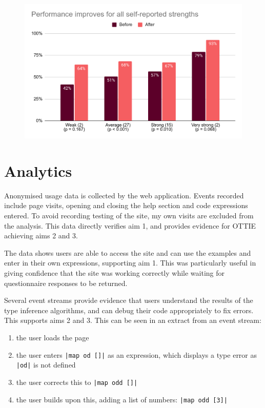 \documentclass[a4paper,fleqn,oneside,12pt]{report}
\begin{document}
{\centering \begin{figure}[h!]
  \centering
  \includegraphics[width=0.85\linewidth]{images/image27.png}
  \label{figure:evaluation_testperformanceselfreported}
\end{figure} \par}

\section{Analytics}\label{id:h.67g05flyfv0z}

Anonymised usage data is collected by the web application. Events recorded include page visits, opening and closing the help section and code expressions entered. To avoid recording testing of the site, my own visits are excluded from the analysis. This data directly verifies aim 1, and provides evidence for OTTIE achieving aims 2 and 3.

The data shows users are able to access the site and can use the examples and enter in their own expressions, supporting aim 1. This was particularly useful in giving confidence that the site was working correctly while waiting for questionnaire responses to be returned.

Several event streams provide evidence that users understand the results of the type inference algorithms, and can debug their code appropriately to fix errors. This supports aims 2 and 3. This can be seen in an extract from an event stream:
\begin{enumerate}
  \item the user loads the page
  \item the user enters \texttt{|map od []|} as an expression, which displays a type error as \texttt{|od|} is not defined
  \item the user corrects this to \texttt{|map odd []|}
  \item the user builds upon this, adding a list of numbers: \texttt{|map odd [3]|}
\end{enumerate}
\end{document}
